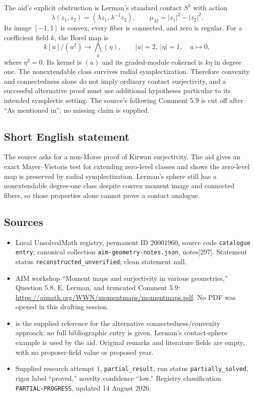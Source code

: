 \documentclass[11pt]{article}
\begin{document}
The aid's explicit obstruction is Lerman's standard contact \(S^3\) with action
\[
 \lambda(z_1,z_2)=(\lambda z_1,\lambda^{-1}z_2),\qquad
 \mu_M=|z_1|^2-|z_2|^2.
\]
Its image \([-1,1]\) is convex, every fiber is connected, and zero is regular. For a coefficient field \(k\), the Borel map is
\[
 k[u]/(u^2)\longrightarrow\bigwedge_k(\eta),\qquad
 |u|=2,\ |\eta|=1,\quad u\longmapsto0,
\]
where \(\eta^2=0\). Its kernel is \((u)\) and its graded-module cokernel is \(k\eta\) in degree one. The nonextendable class survives radial symplectization. Therefore convexity and connectedness alone do not imply ordinary contact surjectivity, and a successful alternative proof must use additional hypotheses particular to its intended symplectic setting. The source's following Comment \(5.9\) is cut off after ``As mentioned in''; no missing claim is supplied.
\subsection{Short English statement}
The source asks for a non-Morse proof of Kirwan surjectivity. The aid gives an exact Mayer--Vietoris test for extending zero-level classes and shows the zero-level map is preserved by radial symplectization. Lerman's sphere still has a nonextendable degree-one class despite convex moment image and connected fibers, so those properties alone cannot prove a contact analogue.
\subsection{Sources}
\begin{itemize}
\item Local UnsolvedMath registry, permanent ID \(20001960\), source code \texttt{catalogue entry}; canonical collection \texttt{aim-geometry-notes.json}, notes[297]. Statement status \texttt{reconstructed\_unverified}; clean statement null.
\item AIM workshop ``Moment maps and surjectivity in various geometries,'' Question \(5.8\), E. Lerman, and truncated Comment \(5.9\): \url{https://aimath.org/WWN/momentmaps/momentmaps.pdf}. No PDF was opened in this drafting session.
\item [CDM88] is the supplied reference for the alternative connectedness/convexity approach; no full bibliographic entry is given. Lerman's contact-sphere example is used by the aid. Original remarks and literature fields are empty, with no proposer-field value or proposed year.
\item Supplied research attempt \(1\), \texttt{partial\_result}, run status \texttt{partially\_solved}, rigor label ``proved,'' novelty confidence ``low.'' Registry classification \texttt{PARTIAL-PROGRESS}, updated 14 August 2026.
\end{itemize}
\end{document}
